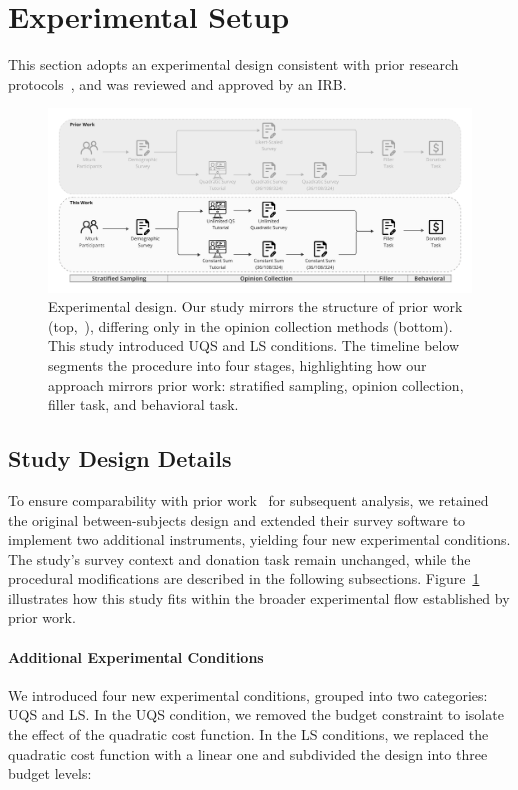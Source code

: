 \section{Experimental Setup}
\label{sec:experiment}
This section adopts an experimental design consistent with prior research protocols~\cite{chengCanShowWhat2021}, and was reviewed and approved by an IRB.

\begin{figure}[t]
    \centering
    \includegraphics[width=\textwidth]{content/image/whyqs_exp_flow.pdf}
    \caption[]{Experimental design. Our study mirrors the structure of prior work (top,~\cite{chengCanShowWhat2021}), differing only in the opinion collection methods (bottom). This study introduced UQS and LS conditions. The timeline below segments the procedure into four stages, highlighting how our approach mirrors prior work: stratified sampling, opinion collection, filler task, and behavioral task.}
    \label{fig:experiment}
\end{figure}

\subsection{Study Design Details}
To ensure comparability with prior work~\cite{chengCanShowWhat2021} for subsequent analysis, we retained the original between-subjects design and extended their survey software to implement two additional instruments, yielding four new experimental conditions. The study's survey context and donation task remain unchanged, while the procedural modifications are described in the following subsections. Figure~\ref{fig:experiment} illustrates how this study fits within the broader experimental flow established by prior work.

\paragraph{Additional Experimental Conditions}
We introduced four new experimental conditions, grouped into two categories: UQS and LS. In the UQS condition, we removed the budget constraint to isolate the effect of the quadratic cost function. In the LS conditions, we replaced the quadratic cost function with a linear one and subdivided the design into three budget levels:

